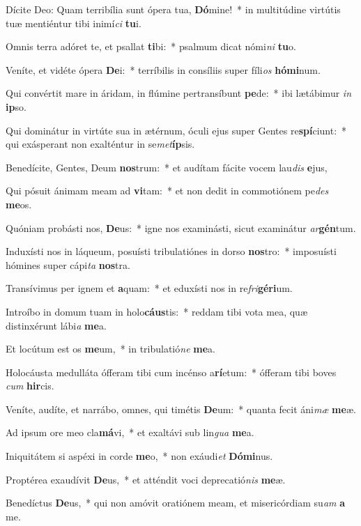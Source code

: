 \item Dícite Deo: Quam terribília sunt ópera tua, \textbf{Dó}mine!~* in multitúdine virtútis tuæ mentiéntur tibi inimí\textit{ci} \textbf{tu}i.
\item Omnis terra adóret te, et psallat \textbf{ti}bi:~* psalmum dicat nómi\textit{ni} \textbf{tu}o.
\item Veníte, et vidéte ópera \textbf{De}i:~* terríbilis in consíliis super fíli\textit{os} \textbf{hó}\textbf{mi}num.
\item Qui convértit mare in áridam, in flúmine pertransíbunt \textbf{pe}de:~* ibi lætábimur \textit{in} \textbf{ip}so.
\item Qui dominátur in virtúte sua in ætérnum, óculi ejus super Gentes re\textbf{spí}ciunt:~* qui exásperant non exalténtur in se\textit{met}\textbf{íp}sis.
\item Benedícite, Gentes, Deum \textbf{nos}trum:~* et audítam fácite vocem lau\textit{dis} \textbf{e}jus,
\item Qui pósuit ánimam meam ad \textbf{vi}tam:~* et non dedit in commotiónem pe\textit{des} \textbf{me}os.
\item Quóniam probásti nos, \textbf{De}us:~* igne nos examinásti, sicut examinátur \textit{ar}\textbf{gén}tum.
\item Induxísti nos in láqueum, posuísti tribulatiónes in dorso \textbf{nos}tro:~* imposuísti hómines super cápi\textit{ta} \textbf{nos}tra.
\item Transívimus per ignem et \textbf{a}quam:~* et eduxísti nos in re\textit{fri}\textbf{gé}\textbf{ri}um.
\item Introíbo in domum tuam in holo\textbf{cáus}tis:~* reddam tibi vota mea, quæ distinxérunt lábi\textit{a} \textbf{me}a.
\item Et locútum est os \textbf{me}um,~* in tribulatió\textit{ne} \textbf{me}a.
\item Holocáusta medulláta ófferam tibi cum incénso a\textbf{rí}etum:~* ófferam tibi boves \textit{cum} \textbf{hir}cis.
\item Veníte, audíte, et narrábo, omnes, qui timétis \textbf{De}um:~* quanta fecit áni\textit{mæ} \textbf{me}æ.
\item Ad ipsum ore meo cla\textbf{má}vi,~* et exaltávi sub lin\textit{gua} \textbf{me}a.
\item Iniquitátem si aspéxi in corde \textbf{me}o,~* non exáudi\textit{et} \textbf{Dó}\textbf{mi}nus.
\item Proptérea exaudívit \textbf{De}us,~* et atténdit voci deprecatió\textit{nis} \textbf{me}æ.
\item Benedíctus \textbf{De}us,~* qui non amóvit oratiónem meam, et misericórdiam su\textit{am} \textbf{a} me.

